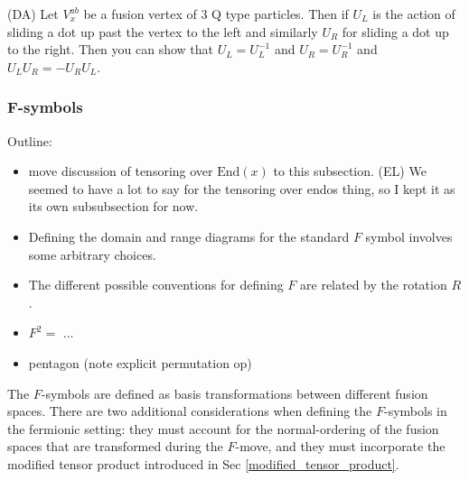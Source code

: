 \documentclass[12pt,a4paper]{article}
\newcommand{\End}{\text{End}}
\newcommand{\dave}[1]{{\color{ao(english)}\footnotesize{(DA) #1}}}
\newcommand{\ethan}[1]{{\color{amethyst}\footnotesize{(EL) #1}}}
\begin{document}
\dave{Let $V^{ab}_x$ be a fusion vertex of $3$ Q type particles. Then if $U_L$ is the action of sliding a dot up past the vertex to the left and similarly $U_R$ for sliding a dot up to the right. Then you can show that $U_L = U_L^{-1}$ and $U_R = U_R^{-1}$ and $U_L U_R = - U_R U_L$.}



\subsubsection{F-symbols}

Outline:
\begin{itemize}
\item move discussion of tensoring over $\End(x)$ to this subsection. 
\ethan{We seemed to have a lot to say for the tensoring over endos thing, so I kept it as its own subsubsection for now.}
\item Defining the domain and range diagrams for the standard $F$ symbol involves some arbitrary choices.
\item The different possible conventions for defining $F$ are related by the rotation $R$.
\item $F^2 = $ ...
\item pentagon (note explicit permutation op)
\end{itemize}

The $F$-symbols are defined as basis transformations between different fusion spaces. 
There are two additional considerations when defining the $F$-symbols in the fermionic setting: they must account for the normal-ordering of the fusion spaces that are transformed during the $F$-move, and they must incorporate the modified tensor product introduced in Sec \ref{modified_tensor_product}. 
\end{document}
